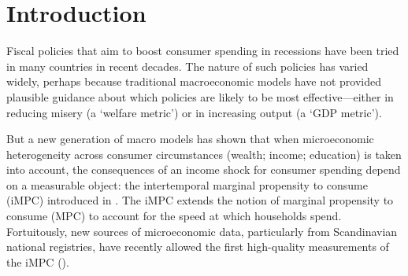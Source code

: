 \documentclass[\econtexRoot/HAFiscal]{subfiles}
\begin{document}
\hypertarget{introduction}{}\par\section{Introduction}\notinsubfile{\label{sec:intro}}
\setcounter{page}{0}

Fiscal policies that aim to boost consumer spending in recessions have been tried in many countries in recent decades.  The nature of such policies has varied widely, perhaps because traditional macroeconomic models have not provided plausible guidance about which policies are likely to be most effective---either in reducing misery (a `welfare metric') or in increasing output (a `GDP metric').

But a new generation of macro models has shown that when microeconomic heterogeneity across consumer circumstances (wealth; income; education) is taken into account, the consequences of an income shock for consumer spending depend on a measurable object: the intertemporal marginal propensity to consume (iMPC) introduced in \cite{auclert2018IKC}.  The iMPC extends the notion of marginal propensity to consume (MPC) to account for the speed at which households spend.  Fortuitously, new sources of microeconomic data, particularly from Scandinavian national registries, have recently allowed the first high-quality measurements of the iMPC (\cite{fagereng_mpc_2021}).
\end{document}
